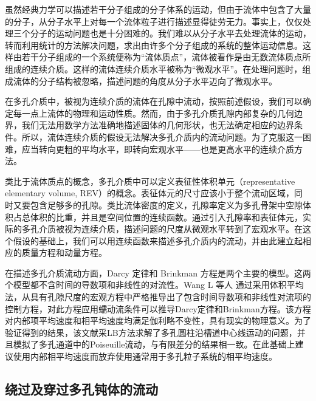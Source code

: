 虽然经典力学可以描述若干分子组成的分子体系的运动，但由于流体中包含了大量的分子，从分子水平上对每一个流体粒子进行描述显得徒劳无力。事实上，仅仅处理三个分子的运动问题也是十分困难的。我们难以从分子水平去处理流体的运动，转而利用统计的方法解决问题，求出由许多个分子组成的系统的整体运动信息。这样由若干分子组成的一个系统便称为“流体质点”，流体被看作是由无数流体质点所组成的连续介质。这样的流体连续介质水平被称为“微观水平”。在处理问题时，组成流体的分子结构被忽略，描述问题的角度从分子水平迈向了微观水平。


在多孔介质中，被视为连续介质的流体在孔隙中流动，按照前述假设，我们可以确定每一点上流体的物理和运动性质。然而，由于多孔介质孔隙内部复杂的几何边界，我们无法用数学方法准确地描述固体的几何形状，也无法确定相应的边界条件。所以，流体连续介质的假设无法解决多孔介质内的流动问题。为了克服这一困难，应当转向更粗的平均水平，即转向宏观水平——也是更高水平的连续介质方法。

类比于流体质点的概念，多孔介质中可以定义表征性体积单元（representative elementary volume, REV）的概念。表征体元的尺寸应该小于整个流动区域，同时又要包含足够多的孔隙。类比流体密度的定义，孔隙率定义为多孔骨架中空隙体积占总体积的比重，并且是空间位置的连续函数。通过引入孔隙率和表征体元，实际的多孔介质被视为连续介质，描述问题的尺度从微观水平转到了宏观水平。在这个假设的基础上，我们可以用连续函数来描述多孔介质内的流动，并由此建立起相应的质量方程和动量方程。


在描述多孔介质流动方面，Darcy 定律和 Brinkman 方程是两个主要的模型。这两个模型都不含时间的导数项和非线性的对流性。Wang L 等人 \cite{Wang2015} 通过采用体积平均法，从具有孔隙尺度的宏观方程中严格推导出了包含时间导数项和非线性对流项的控制方程，对此方程应用蠕动流条件可以推导Darcy定律和Brinkman方程。该方程对内部项平均速度和相平均速度均满足伽利略不变性，具有现实的物理意义。为了验证得到的结果，该文献采LB方法求解了多孔圆柱沿槽道中心线运动的问题，并且模拟了多孔通道中的Poiseuille流动，与有限差分的结果相一致。在此基础上建议使用内部相平均速度而放弃使用通常用于多孔粒子系统的相平均速度。

\subsection{绕过及穿过多孔钝体的流动}

